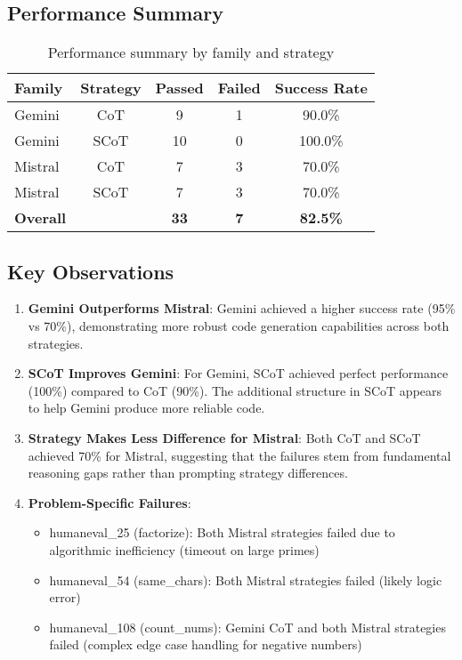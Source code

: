 \documentclass[11pt]{article}
\begin{document}
\subsection{Performance Summary}

\begin{table}[h]
\centering
\begin{tabular}{lcccc}
\toprule
\textbf{Family} & \textbf{Strategy} & \textbf{Passed} & \textbf{Failed} & \textbf{Success Rate} \\
\midrule
Gemini & CoT & 9 & 1 & 90.0\% \\
Gemini & SCoT & 10 & 0 & 100.0\% \\
Mistral & CoT & 7 & 3 & 70.0\% \\
Mistral & SCoT & 7 & 3 & 70.0\% \\
\midrule
\textbf{Overall} & & \textbf{33} & \textbf{7} & \textbf{82.5\%} \\
\bottomrule
\end{tabular}
\caption{Performance summary by family and strategy}
\label{tab:summary}
\end{table}

\subsection{Key Observations}

\begin{enumerate}
    \item \textbf{Gemini Outperforms Mistral}: Gemini achieved a higher success rate (95\% vs 70\%), demonstrating more robust code generation capabilities across both strategies.
    
    \item \textbf{SCoT Improves Gemini}: For Gemini, SCoT achieved perfect performance (100\%) compared to CoT (90\%). The additional structure in SCoT appears to help Gemini produce more reliable code.
    
    \item \textbf{Strategy Makes Less Difference for Mistral}: Both CoT and SCoT achieved 70\% for Mistral, suggesting that the failures stem from fundamental reasoning gaps rather than prompting strategy differences.
    
    \item \textbf{Problem-Specific Failures}: 
    \begin{itemize}
        \item humaneval\_25 (factorize): Both Mistral strategies failed due to algorithmic inefficiency (timeout on large primes)
        \item humaneval\_54 (same\_chars): Both Mistral strategies failed (likely logic error)
        \item humaneval\_108 (count\_nums): Gemini CoT and both Mistral strategies failed (complex edge case handling for negative numbers)
    \end{itemize}
\end{enumerate}
\end{document}
